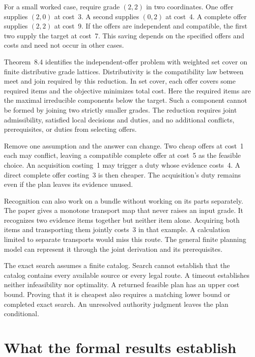 \documentclass{momentum}
\begin{document}
For a small worked case, require grade $(2,2)$ in two coordinates. One offer supplies $(2,0)$ at cost~3. A second supplies $(0,2)$ at cost~4. A complete offer supplies $(2,2)$ at cost~9. If the offers are independent and compatible, the first two supply the target at cost~7. This saving depends on the specified offers and costs and need not occur in other cases.

Theorem~8.4 identifies the independent-offer problem with weighted set cover on finite distributive grade lattices. Distributivity is the compatibility law between meet and join required by this reduction. In set cover, each offer covers some required items and the objective minimizes total cost. Here the required items are the maximal irreducible components below the target. Such a component cannot be formed by joining two strictly smaller grades. The reduction requires joint admissibility, satisfied local decisions and duties, and no additional conflicts, prerequisites, or duties from selecting offers. \cite[Section~8, Theorem~8.4 and Example~8.5]{composes}

Remove one assumption and the answer can change. Two cheap offers at cost~1 each may conflict, leaving a compatible complete offer at cost~5 as the feasible choice. An acquisition costing~1 may trigger a duty whose evidence costs~4. A direct complete offer costing~3 is then cheaper. The acquisition's duty remains even if the plan leaves its evidence unused. \cite[Section~8, Example~8.5]{composes}

Recognition can also work on a bundle without working on its parts separately. The paper gives a monotone transport map that never raises an input grade. It recognizes two evidence items together but neither item alone. Acquiring both items and transporting them jointly costs~3 in that example. A calculation limited to separate transports would miss this route. The general finite planning model can represent it through the joint derivation and its prerequisites.

The exact search assumes a finite catalog. Search cannot establish that the catalog contains every available source or every legal route. A timeout establishes neither infeasibility nor optimality. A returned feasible plan has an upper cost bound. Proving that it is cheapest also requires a matching lower bound or completed exact search. An unresolved authority judgment leaves the plan conditional. \cite[Section~8.1]{composes}

\section{What the formal results establish}
\end{document}
